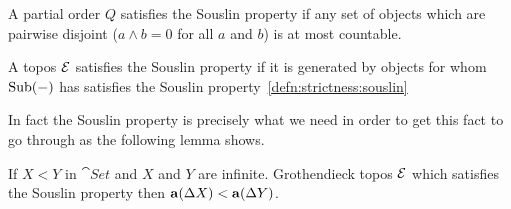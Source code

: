 \begin{defn}\label{defn:strictness:souslin}
  A partial order $Q$ satisfies the Souslin property if any set of
  objects which are pairwise disjoint ($a \wedge b = 0$ for all $a$
  and $b$) is at most countable.
\end{defn}
\begin{defn}\label{defn:strictness:souslintopos}
  A topos $\mathcal{E}$ satisfies the Souslin property if it is generated by
  objects for whom $\operatorname{Sub}(-)$ has satisfies the Souslin
  property~\ref{defn:strictness:souslin}
\end{defn}

In fact the Souslin property is precisely what we need in order to get
this fact to go through as the following lemma shows.

\begin{lem}\label{lem:strictness:souslin}
  If $X < Y$ in $\cat{Set}$ and $X$ and $Y$ are infinite. Grothendieck
  topos $\mathcal{E}$ which satisfies the Souslin property then
  $\mathbf{a}(\Delta X) < \mathbf{a}(\Delta Y)$.
\end{lem}
